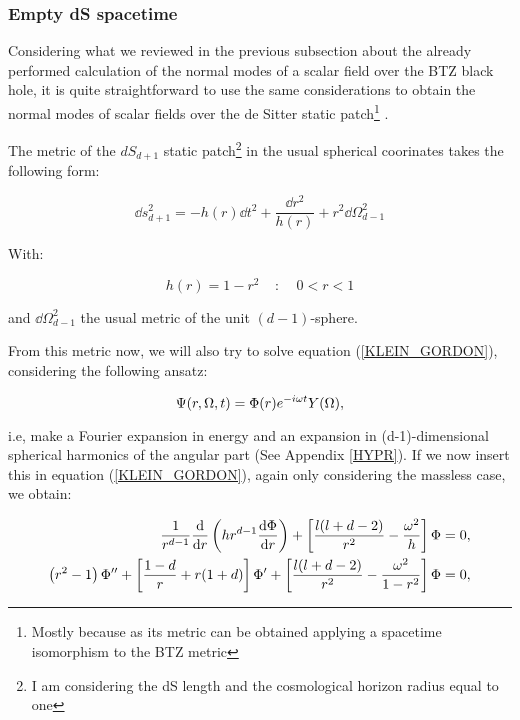 \documentclass[11pt,a4paper]{article}
\begin{document}
{\subsubsection{Empty dS spacetime}

Considering what we reviewed in the previous subsection about the already performed calculation of the normal modes of a scalar field over the BTZ black hole, it is quite straightforward to use the same considerations to obtain the normal modes of scalar fields over the de Sitter static patch\footnote{Mostly because as its metric can be obtained applying a spacetime isomorphism to the BTZ metric} \cite{Anninos_2012} .

The metric of the $dS_{d+1}$ static patch\footnote{I am considering the dS length and the cosmological horizon radius equal to one} in the usual spherical coorinates takes the following form:

\begin{equation}
    \dd s^2_{d+1} = -h(r)\dd t^2 + \frac{\dd r^2}{h(r)}+r^2\dd\Omega_{d-1}^2
\end{equation}

{\noindent With:}

\begin{equation}
    h(r) = 1 - r^2 ~~~~~:~~~~~ 0 < r < 1
\end{equation}

{\noindent and $\dd\Omega^2_{d-1}$ the usual metric of the unit $(d-1)$-sphere.}

From this metric now, we will also try to solve equation (\ref{KLEIN_GORDON}), considering the following ansatz:

\begin{equation}
    \Psi(r,\Omega,t) = \Phi(r)e^{-i\omega t}Y(\Omega),
\end{equation}

{\noindent i.e, make a Fourier expansion in energy and an expansion in (d-1)-dimensional spherical harmonics of the angular part (See Appendix \ref{HYPR}). If we now insert this in equation (\ref{KLEIN_GORDON}), again only considering the massless case, we obtain:}

\begin{equation}
    \begin{aligned}
        \frac{1}{r^{d-1}}\frac{\mathrm{d}}{\mathrm{d} r}\left(hr^{d-1}\frac{\mathrm{d}\Phi}{\mathrm{d} r}\right) +\left[\frac{l(l+d-2)}{r^2}-\frac{\omega^2}{h}\right]\Phi &= 0,\\
        \left(r^2-1\right)\Phi''+\left[\frac{1-d}{r}+r(1+d)\right]\Phi'+\left[\frac{l(l+d-2)}{r^2}-\frac{\omega^2}{1-r^2}\right]\Phi &= 0,
    \end{aligned}
\end{equation}

}
\end{document}
